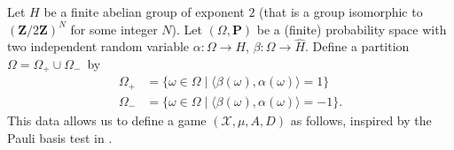 \documentclass[10pt]{amsart}
\theoremstyle{plain}
\theoremstyle{definition}
\newcommand{\Z}{\mathbf{Z}}
\newcommand{\cX}{\mathcal{X}}
\newcommand{\prob}{\mathbf{P}}
\begin{document}
Let $H$ be a finite abelian group of exponent $2$ (that is a group isomorphic to $(\Z/2\Z)^N$ for some integer $N$). Let $(\Omega,\prob)$ be a (finite) probability space with two independent random variable $\alpha:\Omega \to H$, $\beta:\Omega \to \hat H$. Define a partition \hbox{$\Omega= \Omega_+ \cup \Omega_-$}~by\vspace*{-3pt}
\begin{align*}
\Omega_+ &= \{\omega \in \Omega \mid \langle \beta(\omega),\alpha(\omega)\rangle = 1\}
\\
\tag*{and}
\Omega_- &= \{\omega \in \Omega \mid \langle \beta(\omega),\alpha(\omega)\rangle = -1\}.
\end{align*}
This data allows us to define a game $(\cX,\mu,A,D)$ as follows, inspired by the Pauli basis test in \cite{MIPRE}.\vspace*{-3pt}
\end{document}
